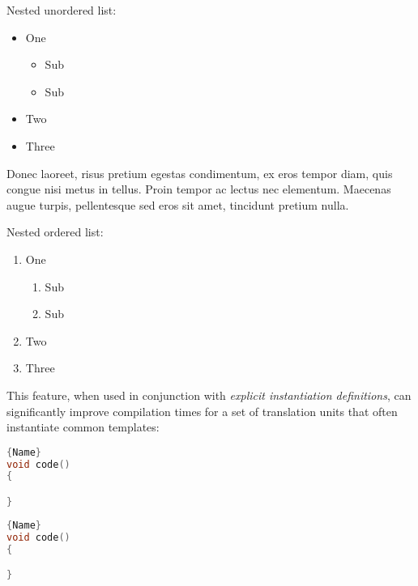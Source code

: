 Nested unordered list:

\begin{itemize}
\item{One\begin{itemize}
\item{Sub}
\item{Sub}
\end{itemize}
}
\item{Two}
\item{Three}
\end{itemize}

Donec
laoreet, risus pretium egestas condimentum, ex eros tempor diam, quis
congue nisi metus in tellus. Proin tempor ac lectus nec elementum.
Maecenas augue turpis, pellentesque sed eros sit amet, tincidunt pretium
nulla. %

Nested ordered list:

\begin{enumerate}\setlength{\leftmarginii}{6mm}
\item{One\begin{enumerate}
\item{Sub}
\item{Sub}
\end{enumerate}
}
\item{Two}
\item{Three}
\end{enumerate}

This feature, when used in conjunction with \emph{explicit instantiation
definitions}, can significantly improve compilation times for a set of
translation units that often instantiate common templates:

\noindent\begin{minipage}{.45\textwidth}
\begin{lstlisting}[language=C++, caption=code 1,frame=tb]{Name}
void code()
{

}
\end{lstlisting}
\end{minipage}\hfill
\begin{minipage}{.45\textwidth}
\begin{lstlisting}[language=C++, caption=code 2,frame=tb]{Name}
void code()
{

}
\end{lstlisting}
\end{minipage}

